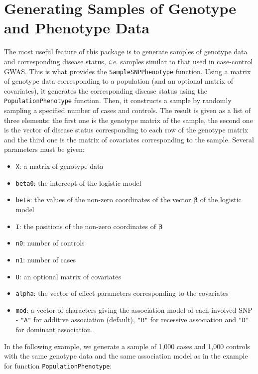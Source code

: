 \documentclass[12pt]{article}
\begin{document}
	\section{Generating Samples of Genotype and Phenotype Data}

	The most useful feature of this package is to generate samples of genotype data and corresponding disease status, \emph{i.e.} samples similar to that used in case-control GWAS. This is what provides the \texttt{SampleSNPPhenotype} function. Using a matrix of genotype data corresponding to a population (and an optional matrix of covariates), it generates the corresponding disease status using the \texttt{PopulationPhenotype} function. Then, it constructs a sample by randomly sampling a specified number of cases and controls. The result is given as a list of three elements: the first one is the genotype matrix of the sample, the second one is the vector of disease status corresponding to each row of the genotype matrix and the third one is the matrix of covariates corresponding to the sample. Several parameters must be given:
	\begin{itemize}
		\item \texttt{X}: a matrix of genotype data
		\item \texttt{beta0}: the intercept of the logistic model
		\item \texttt{beta}: the values of the non-zero coordinates of the vector $\bm{\beta}$ of the logistic model
		\item \texttt{I}: the positions of the non-zero coordinates of $\bm{\beta}$
		\item \texttt{n0}: number of controls
		\item \texttt{n1}: number of cases
		\item \texttt{U}: an optional matrix of covariates
		\item \texttt{alpha}: the vector of effect parameters corresponding to the covariates
		\item \texttt{mod}: a vector of characters giving the association model of each involved SNP - \texttt{"A"} for additive association (default), \texttt{"R"} for recessive association and \texttt{"D"} for dominant association.
	\end{itemize}

	\noindent In the following example, we generate a sample of 1,000 cases and 1,000 controls with the same genotype data and the same association model as in the example for function \texttt{PopulationPhenotype}:
\end{document}
